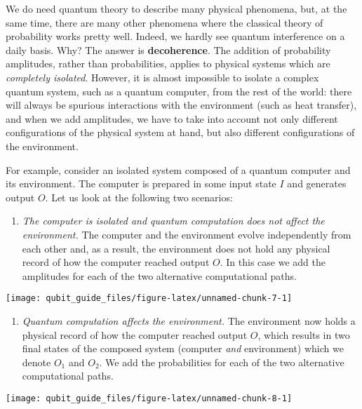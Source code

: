 \documentclass[fleqn]{article}
\providecommand{\tightlist}{%
  \setlength{\itemsep}{0pt}\setlength{\parskip}{0pt}}
\begin{document}
We do need quantum theory to describe many physical phenomena, but, at the same time, there are many other phenomena where the classical theory of probability works pretty well.
Indeed, we hardly see quantum interference on a daily basis.
Why?
The answer is \textbf{decoherence}.
The addition of probability amplitudes, rather than probabilities, applies to physical systems which are \emph{completely isolated}.
However, it is almost impossible to isolate a complex quantum system, such as a quantum computer, from the rest of the world: there will always be spurious interactions with the environment (such as heat transfer), and when we add amplitudes, we have to take into account not only different configurations of the physical system at hand, but also different configurations of the environment.

For example, consider an isolated system composed of a quantum computer and its environment.
The computer is prepared in some input state \(I\) and generates output \(O\).
Let us look at the following two scenarios:

\begin{enumerate}
\def\labelenumi{\arabic{enumi}.}
\tightlist
\item
  \emph{The computer is isolated and quantum computation does not affect the environment.}
  The computer and the environment evolve independently from each other and, as a result, the environment does not hold any physical record of how the computer reached output \(O\).
  In this case we add the amplitudes for each of the two alternative computational paths.
\end{enumerate}

\begin{center}\texttt{[image: qubit\_guide\_files/figure-latex/unnamed-chunk-7-1]} \end{center}

\begin{enumerate}
\def\labelenumi{\arabic{enumi}.}
\setcounter{enumi}{1}
\tightlist
\item
  \emph{Quantum computation affects the environment.}
  The environment now holds a physical record of how the computer reached output \(O\), which results in two final states of the composed system (computer \emph{and} environment) which we denote \(O_1\) and \(O_2\).
  We add the probabilities for each of the two alternative computational paths.
\end{enumerate}

\begin{center}\texttt{[image: qubit\_guide\_files/figure-latex/unnamed-chunk-8-1]} \end{center}
\end{document}
